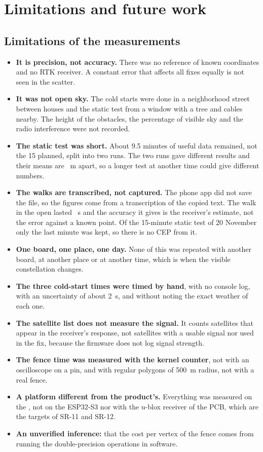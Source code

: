 \section{Limitations and future work}

\subsection{Limitations of the measurements}

\begin{itemize}
  \item \textbf{It is precision, not accuracy.} There was no reference of known coordinates and no RTK
        receiver. A constant error that affects all fixes equally is not seen in the scatter.
  \item \textbf{It was not open sky.} The cold starts were done in a neighborhood street between houses and
        the static test from a window with a tree and cables nearby. The height of the obstacles, the
        percentage of visible sky and the radio interference were not recorded.
  \item \textbf{The static test was short.} About 9.5 minutes of useful data remained, not the 15 planned,
        split into two runs. The two runs gave different results and their means are \dStaticRunSeparation~m
        apart, so a longer test at another time could give different numbers.
  \item \textbf{The walks are transcribed, not captured.} The phone app did not save the file, so the figures come
        from a transcription of the copied text. The walk in the open lasted \dWalkSeconds~s and the accuracy it gives is
        the receiver's estimate, not the error against a known point. Of the 15-minute static test of 20 November only the
        last minute was kept, so there is no CEP from it.
  \item \textbf{One board, one place, one day.} None of this was repeated with another board, at another place
        or at another time, which is when the visible constellation changes.
  \item \textbf{The three cold-start times were timed by hand}, with no console log, with an uncertainty of
        about 2~s, and without noting the exact weather of each one.
  \item \textbf{The satellite list does not measure the signal.} It counts satellites that appear in the
        receiver's response, not satellites with a usable signal nor used in the fix, because the firmware does
        not log signal strength.
  \item \textbf{The fence time was measured with the kernel counter}, not with an oscilloscope on a pin, and
        with regular polygons of 500~m radius, not with a real fence.
  \item \textbf{A platform different from the product's.} Everything was measured on the \dSoc{}, not on the
        ESP32-S3 nor with the u-blox receiver of the PCB, which are the targets of SR-11 and SR-12.
  \item \textbf{An unverified inference:} that the cost per vertex of the fence comes from running the
        double-precision operations in software.
\end{itemize}

